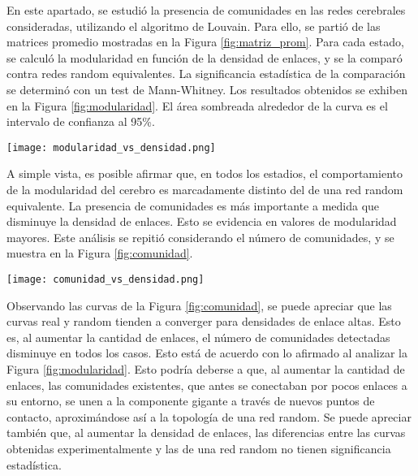 \documentclass[a4paper,10pt,twocolumn,spanish]{article}
\begin{document}
En este apartado, se estudió la presencia de comunidades en las redes cerebrales consideradas, utilizando el algoritmo de Louvain. Para ello, se partió de las matrices promedio mostradas en la Figura \ref{fig:matriz_prom}. Para cada estado, se calculó la modularidad en función de la densidad de enlaces, y se la comparó contra redes random equivalentes. La significancia estadística de la comparación se determinó con un test de Mann-Whitney. Los resultados obtenidos se exhiben en la Figura \ref{fig:modularidad}. El área sombreada alrededor de la curva es el intervalo de confianza al 95\%.

\begin{figure*}[htb]
\centering
\texttt{[image: modularidad\_vs\_densidad.png]}
\caption{Dependencia de modularidad con densidad de enlaces}
\label{fig:modularidad}
\end{figure*}

A simple vista, es posible afirmar que, en todos los estadios, el comportamiento de la modularidad del cerebro es marcadamente distinto del de una red random equivalente. La presencia de comunidades es más importante a medida que disminuye la densidad de enlaces. Esto se evidencia en valores de modularidad mayores. Este análisis se repitió considerando el número de comunidades, y se muestra en la Figura \ref{fig:comunidad}.

\begin{figure*}[htb]
\centering
\texttt{[image: comunidad\_vs\_densidad.png]}
\caption{Número de comunidades detectadas versus densidad de enlaces}
\label{fig:comunidad}
\end{figure*}

Observando las curvas de la Figura \ref{fig:comunidad}, se puede apreciar que las curvas real y random tienden a converger para densidades de enlace altas. Esto es, al aumentar la cantidad de enlaces, el número de comunidades detectadas disminuye en todos los casos. Esto está de acuerdo con lo afirmado al analizar la Figura \ref{fig:modularidad}. Esto podría deberse a que, al aumentar la cantidad de enlaces, las comunidades existentes, que antes se conectaban por pocos enlaces a su entorno, se unen a la componente gigante a través de nuevos puntos de contacto, aproximándose así a la topología de una red random. Se puede apreciar también que, al aumentar la densidad de enlaces, las diferencias entre las curvas obtenidas experimentalmente y las de una red random no tienen significancia estadística.
\end{document}
